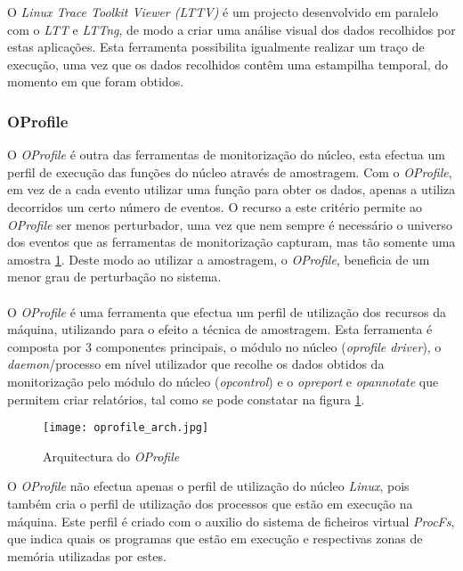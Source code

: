 O \textit{Linux Trace Toolkit Viewer (LTTV)} é um projecto desenvolvido em paralelo com o \textit{LTT} e \textit{LTTng}, de modo a criar uma análise visual dos dados recolhidos por estas aplicações.
Esta ferramenta possibilita igualmente realizar um traço de execução, uma vez que os dados recolhidos contêm uma estampilha temporal, do momento em que foram obtidos.
 
\subsubsection{OProfile}\label{cap:Oprofile_overview}
O \textit{OProfile} é outra das ferramentas de monitorização do núcleo, esta efectua um perfil de execução das funções do núcleo através de amostragem. 
Com o \textit{OProfile}, em vez de a cada evento utilizar uma função para obter os dados, apenas a utiliza decorridos um certo número de eventos.
O recurso a este critério permite ao \textit{OProfile} ser menos perturbador, uma vez que nem sempre é necessário o universo dos eventos que as ferramentas de monitorização capturam, mas tão somente uma amostra \ref{fig:oprofile_arch}.
Deste modo ao utilizar a amostragem, o \textit{OProfile}, beneficia de um menor grau de perturbação no sistema\cite{Will:TuninProgrOProf}.

\paragraph*{}
O \textit{OProfile} é uma ferramenta que efectua um perfil de utilização dos recursos da máquina, utilizando para o efeito a técnica de amostragem.
Esta ferramenta é composta por 3 componentes principais, o módulo no núcleo (\textit{oprofile driver}), o \textit{daemon}/processo em nível utilizador que recolhe os dados obtidos da monitorização pelo módulo do núcleo (\textit{opcontrol}) e o \textit{opreport} e \textit{opannotate} que permitem criar relatórios, tal como se pode constatar na figura \ref{fig:oprofile_arch}.

\begin{figure}[!htb]
       \centering
       \texttt{[image: oprofile\_arch.jpg]}
       \caption{Arquitectura do \textit{OProfile} \cite{Will:TuninProgrOProf}}
	\label{fig:oprofile_arch}
\end{figure}

O \textit{OProfile} não efectua apenas o perfil de utilização do núcleo \textit{Linux}, pois também cria o perfil de utilização dos processos que estão em execução na máquina.
Este perfil é criado com o auxilio do sistema de ficheiros virtual \textit{ProcFs}, que indica quais os programas que estão em execução e respectivas zonas de memória utilizadas por estes.

